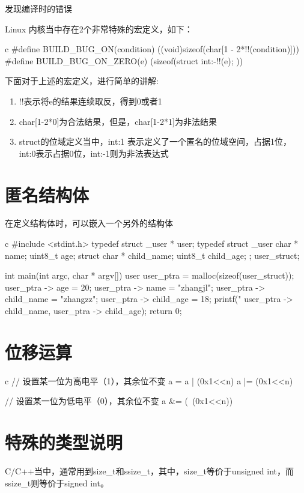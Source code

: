 \begin{outline}[enumerate]
\1 发现编译时的错误

Linux 内核当中存在2个非常特殊的宏定义，如下：
\begin{code-in-enumerate}{c}
#define BUILD_BUG_ON(condition) ((void)sizeof(char[1 - 2*!!(condition)]))
#define BUILD_BUG_ON_ZERO(e) (sizeof(struct { int:-!!(e); }))
\end{code-in-enumerate}

下面对于上述的宏定义，进行简单的讲解:
\begin{enumerate}
  \item !!表示将e的结果连续取反，得到0或者1
  \item char[1-2*0]为合法结果，但是，char[1-2*1]为非法结果
  \item struct的位域定义当中，int:1 表示定义了一个匿名的位域空间，占据1位，int:0表示占据0位，int:-1则为非法表达式
\end{enumerate}

\end{outline}

\section{匿名结构体}
在定义结构体时，可以嵌入一个另外的结构体
\begin{code-block}{c}
#include <stdint.h>
typedef struct _user * user;
typedef struct _user {
    char * name;
    uint8_t age;
    struct {
        char * child_name;
        uint8_t child_age;
    };
}user_struct;

int main(int argc, char * argv[])
{
    user user_ptra = malloc(sizeof(user_struct));
    user_ptra -> age = 20;
    user_ptra -> name = "zhangjl";
    user_ptra -> child_name = "zhangzz";
    user_ptra -> child_age = 18;
    printf("%
           user_ptra -> child_name, user_ptra -> child_age);
    return 0;
}
\end{code-block}

\section{位移运算}
\begin{code-block}{c}
// 设置某一位为高电平（1），其余位不变
a = a | (0x1<<n)
a |= (0x1<<n)

// 设置某一位为低电平（0），其余位不变
a &= (~(0x1<<n))
\end{code-block}

\section{特殊的类型说明}

C/C++当中，通常用到size\_t和ssize\_t，其中，size\_t等价于unsigned int，而
ssize\_t则等价于signed int。
